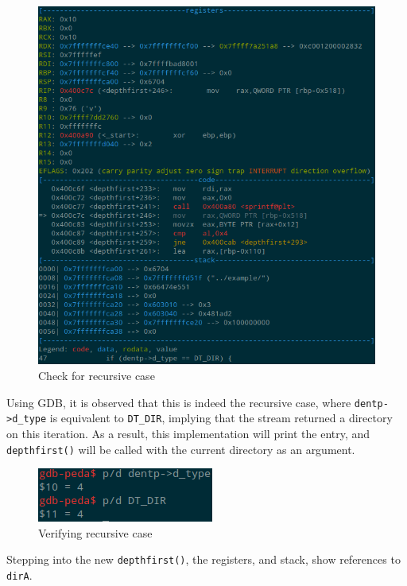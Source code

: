 \documentclass[a4paper,12pt,sffamily]{article}
\begin{document}
\begin{figure}[H]
	\centering
	\includegraphics[width=1\linewidth]{./images/7}
	\caption[directory_check]{Check for recursive case}
	\label{fig:8}
\end{figure}
Using GDB, it is observed that this is indeed the recursive case, where \texttt{dentp->d_type} is
equivalent to \texttt{DT_DIR}, implying that the stream returned a directory on this iteration. As a result, this implementation will print the entry, and \texttt{depthfirst()} will be called
with the current directory as an argument.
\begin{figure}[H]
	\centering
	\includegraphics[width=.3\linewidth]{./images/8}
	\caption[verify_recursive_case]{Verifying recursive case}
	\label{fig:9}
\end{figure}
Stepping into the new \texttt{depthfirst()}, the registers, and stack, show references to 
\texttt{dirA}.
\end{document}
